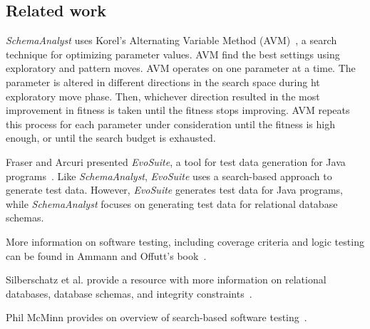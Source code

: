 \subsection{Related work}
\textit{SchemaAnalyst} uses Korel's Alternating Variable Method (AVM)~\cite{Korel:AVM},
a search technique for optimizing parameter values. AVM find the best settings using 
exploratory and pattern moves. AVM operates on one parameter at a time. The parameter is
altered in different directions in the search space during ht exploratory move phase.  Then,
whichever direction resulted in the most improvement in fitness is taken until the fitness stops 
improving. AVM repeats this process for each parameter under consideration until the fitness is
high enough, or until the search budget is exhausted.

Fraser and Arcuri presented \textit{EvoSuite}, a tool for test data generation for
Java programs~\cite{Fraser2011evosuite}.
Like \textit{SchemaAnalyst}, \textit{EvoSuite} uses a search-based approach 
to generate test data. However, \textit{EvoSuite} generates test data for Java programs, while
\textit{SchemaAnalyst} focuses on generating test data for relational database schemas.

More information on software testing, including coverage criteria and logic testing
can be found in Ammann and Offutt's book~\cite{ammann2008}.

Silberschatz et al. provide a resource with more information on relational databases,
database schemas, and integrity constraints~\cite{databasebook}.

Phil McMinn provides on overview of search-based software testing~\cite{STVR:STVR294}.
